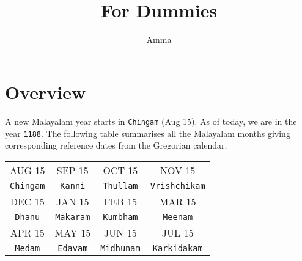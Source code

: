 \documentclass[10pt,twoside]{article}
\title{\textbf{\doctitle}\\
For Dummies}
\author{Amma}
\begin{document}
\thispagestyle{empty}

\maketitle

\section{Overview}
A new Malayalam year starts in \verb|Chingam| (Aug 15). As of today, we are in the year \verb|1188|. The following table summarises all the Malayalam months giving corresponding reference dates from the Gregorian calendar.

\begin{table}[!h]
\centering
\begin{tabular}{| c | c | c | c |}
\hline
AUG 15 & SEP 15 & OCT 15 & NOV 15 \\ 
\verb|Chingam| & \verb|Kanni| & \verb|Thullam| & \verb|Vrishchikam| \\ \hline
DEC 15 & JAN 15 & FEB 15 & MAR 15 \\ 
\verb|Dhanu| & \verb|Makaram| & \verb|Kumbham| & \verb|Meenam| \\ \hline
APR 15 & MAY 15 & JUN 15 & JUL 15 \\ 
\verb|Medam| & \verb|Edavam| & \verb|Midhunam| & \verb|Karkidakam| \\ \hline
\end{tabular}
\label{table:overview}
\end{table}
\end{document}

